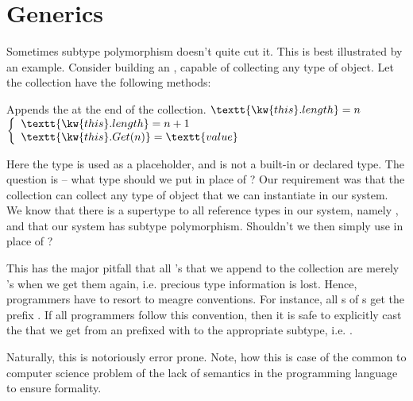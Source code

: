 \chapter{Generics}

Sometimes subtype polymorphism doesn't quite cut it. This is best illustrated
by an example. Consider building an , capable of
collecting any type of object. Let the collection have the following methods:

\begin{codebox}
\end{codebox}

\begin{codebox}
\zi Appends the  at the end of the collection.
\zi {} $\textt{\kw{this}.length} = n$
\zi {} $\left\{
\begin{array}{l}
\textt{\kw{this}.length} = n + 1\\
\textt{\kw{this}.Get(n)} = \textt{value}
\end{array}
\right.$
\end{codebox}

\begin{codebox}
\end{codebox}

Here the type  is used as a placeholder, and is not a built-in or
declared type.  The question is -- what type should we put in place of
? Our requirement was that the collection can collect any type of
object that we can instantiate in our system. We know that there is a supertype
to all reference types in our system, namely , and that our system
has subtype polymorphism.  Shouldn't we then simply use  in place
of ?

This has the major pitfall that all 's that we append to the
collection are merely 's when we get them again, i.e. precious
type information is lost. Hence, programmers have to resort to meagre
conventions. For instance, all s of s
get the prefix . If all programmers follow this
convention, then it is safe to explicitly cast the  that we get
from an  prefixed with  to the
appropriate subtype, i.e. .

Naturally, this is notoriously error prone. Note, how this is case of the
common to computer science problem of the lack of semantics in the programming
language to ensure formality.

